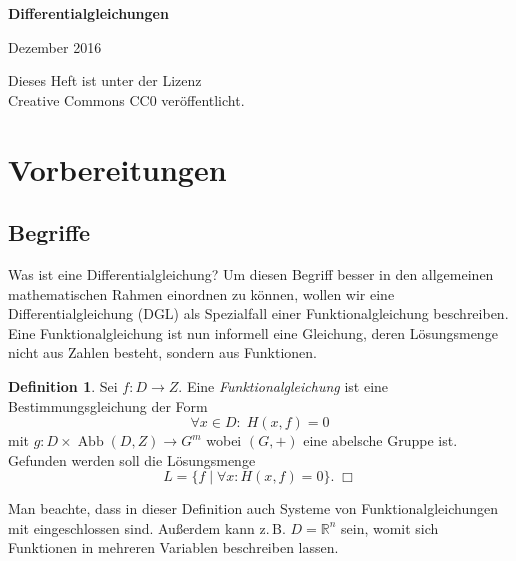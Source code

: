 \documentclass[a4paper,10pt,fleqn,twocolumn,twoside,openany]{article}
\numberwithin{equation}{section}
\newcommand{\R}{\mathbb R}
\theoremstyle{definition}
\newtheorem{Definition}{Definition}
\begin{document}
\setlength{\abovedisplayskip}{6pt}
\setlength{\belowdisplayskip}{6pt}
\setlength{\abovedisplayshortskip}{6pt}
\setlength{\belowdisplayshortskip}{6pt}

\begin{titlepage}
\centering
\phantom{x}

\vspace{20em}
{\noindent\Huge\sffamily\textbf{Differentialgleichungen}}

\vspace{2em}
{\Large Dezember 2016}\\
\end{titlepage}

\thispagestyle{empty}

\noindent
Dieses Heft ist unter der Lizenz\\
Creative Commons CC0 veröffentlicht.

\renewcommand{\contentsname}{
\normalfont\sffamily\bfseries\LARGE
Inhaltsverzeichnis}
\tableofcontents

\section{Vorbereitungen}
\subsection{Begriffe}
Was ist eine Differentialgleichung? Um diesen Begriff besser in den
allgemeinen mathematischen Rahmen einordnen zu können, wollen wir eine
Differentialgleichung (DGL) als Spezialfall einer Funktionalgleichung
beschreiben. Eine Funktionalgleichung ist nun informell eine Gleichung,
deren Lösungsmenge nicht aus Zahlen besteht, sondern aus Funktionen.

\begin{Definition}
Sei $f\colon D\to Z$. Eine \emph{Funktionalgleichung} ist
eine Bestimmungsgleichung der Form
\begin{equation}\label{eq:Funktionalgleichung}
\forall x{\in}D\colon\;H(x,f)=0
\end{equation}
mit $g\colon D\times\operatorname{Abb}(D,Z)\to G^m$ wobei $(G,+)$
eine abelsche Gruppe ist. Gefunden werden soll die
Lösungsmenge%
\begin{equation}
L = \{f\mid\forall x\colon H(x,f)=0\}.\;\Box
\end{equation}
\end{Definition}
\noindent
Man beachte, dass in dieser Definition auch Systeme
von Funktionalgleichungen
mit eingeschlossen sind. Außerdem kann z.\,B. $D=\R^n$ sein, womit
sich Funktionen in mehreren Variablen beschreiben lassen.
\end{document}
